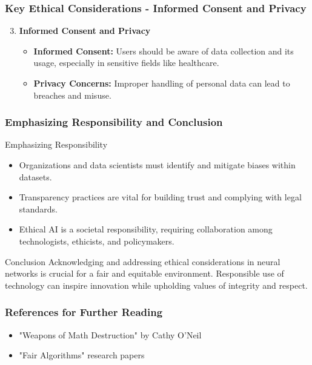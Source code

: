 \documentclass[aspectratio=169]{beamer}
\begin{document}
\begin{frame}[fragile]
  \frametitle{Key Ethical Considerations - Informed Consent and Privacy}
  \begin{enumerate}
      \setcounter{enumi}{2} %
      \item \textbf{Informed Consent and Privacy}
      \begin{itemize}
          \item \textbf{Informed Consent:} Users should be aware of data collection and its usage, especially in sensitive fields like healthcare.
          \item \textbf{Privacy Concerns:} Improper handling of personal data can lead to breaches and misuse.
      \end{itemize}
  \end{enumerate}
\end{frame}

\begin{frame}[fragile]
  \frametitle{Emphasizing Responsibility and Conclusion}
  \begin{block}{Emphasizing Responsibility}
      \begin{itemize}
          \item Organizations and data scientists must identify and mitigate biases within datasets.
          \item Transparency practices are vital for building trust and complying with legal standards.
          \item Ethical AI is a societal responsibility, requiring collaboration among technologists, ethicists, and policymakers.
      \end{itemize}
  \end{block}

  \begin{block}{Conclusion}
      Acknowledging and addressing ethical considerations in neural networks is crucial for a fair and equitable environment. Responsible use of technology can inspire innovation while upholding values of integrity and respect.
  \end{block}
\end{frame}

\begin{frame}[fragile]
  \frametitle{References for Further Reading}
  \begin{itemize}
      \item "Weapons of Math Destruction" by Cathy O'Neil
      \item "Fair Algorithms" research papers
  \end{itemize}
\end{frame}
\end{document}
